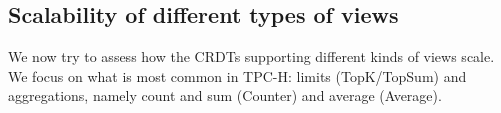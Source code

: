 \documentclass[sigconf, nonacm]{acmart}
\begin{document}
%
%

\subsection{Scalability of different types of views}
\label{subsec:microbenchmarks}

We now try to assess how the CRDTs supporting different kinds of views scale.
We focus on what is most common in TPC-H: limits (TopK/TopSum) and aggregations, namely count and sum (Counter) and average (Average).
\end{document}
